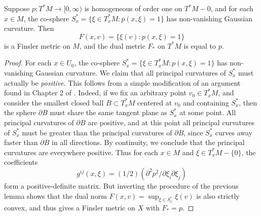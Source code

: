\begin{lemma}
  Suppose $p: T^* M \to [0,\infty)$ is homogeneous of order one on $T^* M - 0$, and for each $x \in M$, the co-sphere $S_x^* = \{ \xi \in T_x^* M : p(x,\xi) = 1 \}$ has non-vanishing Gaussian curvature. Then
  \[ F(x,v) = \{ \xi(v) : p(x,\xi) = 1 \} \]
  is a Finsler metric on $M$, and the dual metric $F_*$ on $T^*M$ is equal to $p$.
\end{lemma}
\begin{proof}
  For each $x \in U_0$, the co-sphere $S_x^* = \{ \xi \in T_x^* M : p(x,\xi) = 1 \}$ has non-vanishing Gaussian curvature. We claim that all principal curvatures of $S_x^*$ must actually be \emph{positive}. This follows from a simple modification of an argument found in Chapter 2 of \cite{HeinzHopf}. Indeed, if we fix an arbitrary point $v_0 \in T_x^*M$, and consider the smallest closed ball $B \subset T_x^* M$ centered at $v_0$ and containing $S_x^*$, then the sphere $\partial B$ must share the same tangent plane as $S_x^*$ at some point. All principal curvatures of $\partial B$ are positive, and at this point all principal curvatures of $S_x^*$ must be greater than the principal curvatures of $\partial B$, since $S_x^*$ curves away faster than $\partial B$ in all directions. By continuity, we conclude that the principal curvatures are everywhere positive.  Thus for each $x \in M$ and $\xi \in T_x^* M - \{ 0 \}$, the coefficients
  \begin{equation}
    g^{ij}(x,\xi) = (1/2) (\partial^2 p^2 / \partial \xi_i \partial \xi_j)
  \end{equation}
  form a positive-definite matrix. But inverting the procedure of the previous lemma shows that the dual norm $F(x,v) = \sup\nolimits_{\xi \in S_x^*} \xi(v)$ is also strictly convex, and thus gives a Finsler metric on $X$ with $F_* = p$. %
\end{proof}

%


